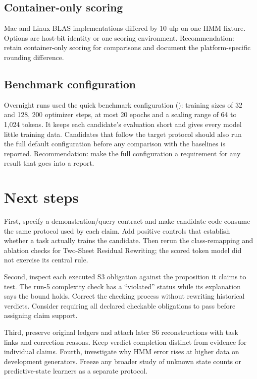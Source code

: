 \subsection{Container-only scoring}

Mac and Linux BLAS implementations differed by 10 ulp on one HMM fixture. Options are host-bit identity or one scoring environment. Recommendation: retain container-only scoring for comparisons and document the platform-specific rounding difference.

\subsection{Benchmark configuration}

Overnight runs used the quick benchmark configuration (): training sizes of 32 and 128, 200 optimizer steps, at most 20 epochs and a scaling range of 64 to 1,024 tokens. It keeps each candidate's evaluation short and gives every model little training data. Candidates that follow the target protocol should also run the full default configuration before any comparison with the baselines is reported. Recommendation: make the full configuration a requirement for any result that goes into a report.

\section{Next steps}

First, specify a demonstration/query contract and make candidate code consume the same protocol used by each claim. Add positive controls that establish whether a task actually trains the candidate. Then rerun the class-remapping and ablation checks for Two-Sheet Residual Rewriting; the scored token model did not exercise its central rule.

Second, inspect each executed S3 obligation against the proposition it claims to test. The run-5 complexity check has a ``violated'' status while its explanation says the bound holds. Correct the checking process without rewriting historical verdicts. Consider requiring all declared checkable obligations to pass before assigning claim support.

Third, preserve original ledgers and attach later S6 reconstructions with task links and correction reasons. Keep verdict completion distinct from evidence for individual claims. Fourth, investigate why HMM error rises at higher data on development generators. Freeze any broader study of unknown state counts or predictive-state learners as a separate protocol.

